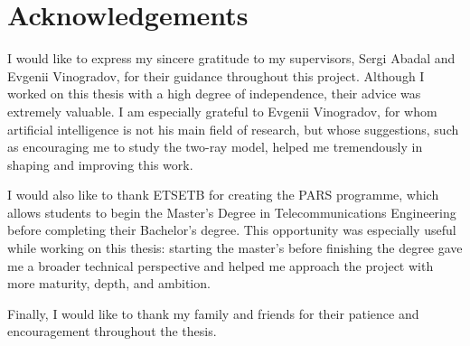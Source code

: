 \clearpage
\chapter*{Acknowledgements}
{}

I would like to express my sincere gratitude to my supervisors, Sergi Abadal and Evgenii Vinogradov, for their guidance throughout this project. Although I worked on this thesis with a high degree of independence, their advice was extremely valuable. I am especially grateful to Evgenii Vinogradov, for whom artificial intelligence is not his main field of research, but whose suggestions, such as encouraging me to study the two-ray model, helped me tremendously in shaping and improving this work.

I would also like to thank ETSETB for creating the PARS programme, which allows students to begin the Master's Degree in Telecommunications Engineering before completing their Bachelor's degree. This opportunity was especially useful while working on this thesis: starting the master's before finishing the degree gave me a broader technical perspective and helped me approach the project with more maturity, depth, and ambition.

Finally, I would like to thank my family and friends for their patience and encouragement throughout the thesis.
